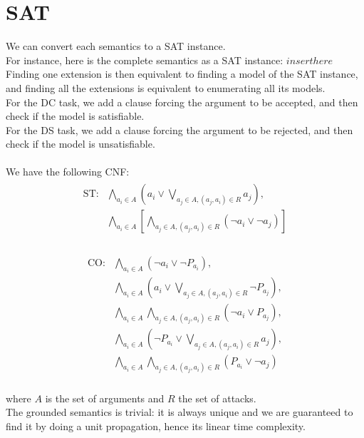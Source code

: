 \documentclass[11pt]{article}
\begin{document}
\section{SAT}
We can convert each semantics to a SAT instance. \\
For instance, here is the complete semantics as a SAT instance:
$
insert here
$
Finding one extension is then equivalent to finding a model of the SAT instance, and finding all the extensions is equivalent to enumerating all its models. \\
For the DC task, we add a clause forcing the argument to be accepted, and then check if the model is satisfiable. \\
For the DS task, we add a clause forcing the argument to be rejected, and then check if the model is unsatisfiable. \\ \\
We have the following CNF: \\
\begin{align}
\begin{split}
\text{ST}: &\bigwedge_{a_i\in A}\left(a_i \lor \bigvee_{a_j\in A, (a_j, a_i)\in R}a_j\right), \\
&\bigwedge_{a_i\in A}\left[\bigwedge_{a_j\in A, (a_j, a_i)\in R}\left(\lnot a_i \lor \lnot a_j\right)\right]
\end{split}
\end{align} \\
\begin{align}
\begin{split}
\text{CO}: &\bigwedge_{a_i\in A}\left(\lnot a_i \lor \lnot P_{a_i}\right), \\
&\bigwedge_{a_i\in A}\left(a_i \lor \bigvee_{a_j\in A, (a_j, a_i)\in R}\lnot P_{a_j}\right), \\
&\bigwedge_{a_i\in A}\bigwedge_{a_j\in A, (a_j, a_i)\in R}\left(\lnot a_i \lor P_{a_j}\right), \\
&\bigwedge_{a_i\in A}\left(\lnot P_{a_i} \lor \bigvee_{a_j\in A, (a_j, a_i)\in R}a_j\right), \\
&\bigwedge_{a_i\in A}\bigwedge_{a_j\in A, (a_j, a_i)\in R}\left(P_{a_i} \lor \lnot a_j\right)
\end{split}
\end{align} \\
where $A$ is the set of arguments and $R$ the set of attacks\cite{lagniez2015coquiaas}. \\
The grounded semantics is trivial: it is always unique and we are guaranteed to find it by doing a unit propagation, hence its linear time complexity. \\
\end{document}
